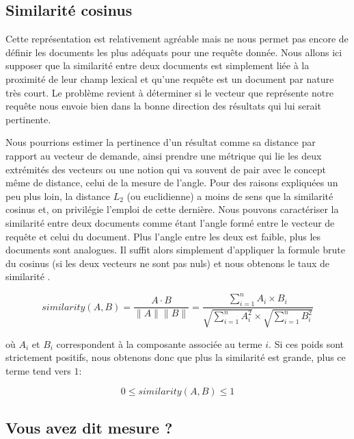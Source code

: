 \subsection{Similarité cosinus}

Cette représentation est relativement agréable mais ne nous permet pas encore de définir les documents les plus adéquats pour une requête donnée. Nous allons ici supposer que la similarité entre deux documents est simplement liée à la proximité de leur champ lexical et qu'une requête est un document par nature très court. Le problème revient à déterminer si le vecteur que représente notre requête nous envoie bien dans la bonne direction des résultats qui lui serait pertinente.

Nous pourrions estimer la pertinence d'un résultat comme sa distance par rapport au vecteur de demande, ainsi prendre une métrique qui lie les deux extrémités des vecteurs ou une notion qui va souvent de pair avec le concept même de distance, celui de la mesure de l'angle. Pour des raisons expliquées un peu plus loin, la distance $L_2$ (ou euclidienne) a moins de sens que la similarité cosinus et, on privilégie l'emploi de cette dernière. Nous pouvons caractériser la similarité entre deux documents comme étant l'angle formé entre le vecteur de requête et celui du document. Plus l'angle entre les deux est faible, plus les documents sont analogues. Il suffit alors simplement d'appliquer la formule brute du cosinus (si les deux vecteurs ne sont pas nuls) et nous obtenons le taux de similarité \cite{tan2006introduction}.

$$ similarity(A, B)  = \frac{A \cdot B}{\lVert A \rVert \lVert B \rVert} = \frac{\sum\nolimits_{i=1}^n A_i \times B_i}{\sqrt{\sum\nolimits_{i=1}^n A_i^2} \times \sqrt{\sum\nolimits_{i=1}^n B_i^2}} $$

où $A_i$ et $B_i$ correspondent à la composante associée au terme $i$. Si ces poids sont strictement positifs, nous obtenons donc que plus la similarité est grande, plus ce terme tend vers $1$:

$$ 0 \leq similarity(A, B) \leq 1 $$

\subsection{Vous avez dit mesure ?}

